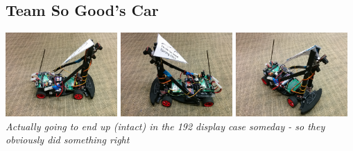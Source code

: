 \documentclass{article}
\begin{document}
\subsection{Team So Good's Car}
{\centering
\includegraphics[width=0.32\textwidth]{images-dis2-carcritiques/sogood-side1}
\includegraphics[width=0.32\textwidth]{images-dis2-carcritiques/sogood-side2}
\includegraphics[width=0.32\textwidth]{images-dis2-carcritiques/sogood-angle} \\
\textit{Actually going to end up (intact) in the 192 display case someday - so they obviously did something right} \\}
\end{document}
